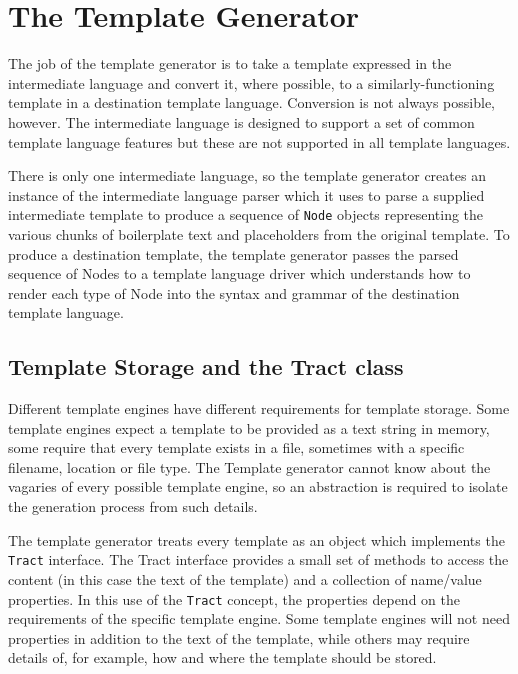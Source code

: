 \section*{The Template Generator}
\label{gilt:generator}

The job of the template generator is to take a template expressed in the intermediate language and convert it, where possible, to a similarly-functioning template in a destination template language. Conversion is not always possible, however. The intermediate language is designed to support a set of common template language features but these are not supported in all template languages.

There is only one intermediate language, so the template generator creates an instance of the intermediate language parser which it uses to parse a supplied intermediate template to produce a sequence of \verb!Node! objects representing the various chunks of boilerplate text and placeholders from the original template. To produce a destination template, the template generator passes the parsed sequence of Nodes to a template language driver which understands how to render each type of Node into the syntax and grammar of the destination template language.

\subsection*{Template Storage and the Tract class}
\label{gilt:tract}

Different template engines have different requirements for template storage. Some template engines expect a template to be provided as a text string in memory, some require that every template exists in a file, sometimes with a specific filename, location or file type. The Template generator cannot know about the vagaries of every possible template engine, so an abstraction is required to isolate the generation process from such details.

The template generator treats every template as an object which implements the \verb!Tract! interface. The Tract interface provides a small set of methods to access the content (in this case the text of the template) and a collection of name/value properties. In this use of the \verb!Tract! concept, the properties depend on the requirements of the specific template engine. Some template engines will not need properties in addition to the text of the template, while others may require details of, for example, how and where the template should be stored.

